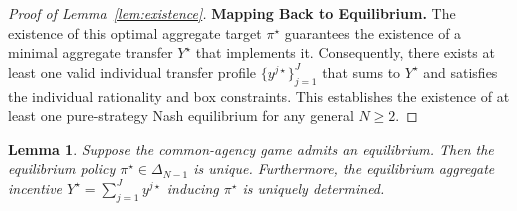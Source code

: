 \documentclass{article}
\newtheorem{lemma}{Lemma}
\begin{document}
\begin{proof}[Proof of Lemma~\ref{lem:existence}]
\textbf{Mapping Back to Equilibrium.}
The existence of this optimal aggregate target $\pi^\star$ guarantees the existence of a minimal aggregate transfer $Y^\star$ that implements it. Consequently, there exists at least one valid individual transfer profile $\{y^{j\star}\}_{j=1}^J$ that sums to $Y^\star$ and satisfies the individual rationality and box constraints. This establishes the existence of at least one pure-strategy Nash equilibrium for any general $N \ge 2$.
\end{proof}

\begin{lemma}\label{lem:uniqueness}
Suppose the common-agency game admits an equilibrium. Then the equilibrium policy $\pi^\star \in \Delta_{N-1}$ is unique. Furthermore, the equilibrium aggregate incentive $Y^\star = \sum_{j=1}^J y^{j\star}$ inducing $\pi^\star$ is uniquely determined.
\end{lemma}
\end{document}
